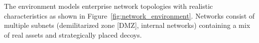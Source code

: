 \documentclass[12pt,oneside]{article}
\begin{document}
The environment models enterprise network topologies with realistic characteristics as shown in Figure~\ref{fig:network_environment}. Networks consist of multiple subnets (demilitarized zone [DMZ], internal networks) containing a mix of real assets and strategically placed decoys.

\end{document}
